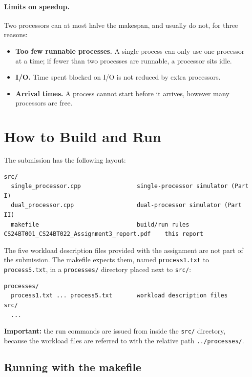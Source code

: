 \documentclass[11pt,a4paper]{article}
\begin{document}
\paragraph{Limits on speedup.} Two processors can at most halve the makespan, and usually
do not, for three reasons:
\begin{itemize}\itemsep1pt
  \item \textbf{Too few runnable processes.} A single process can only use one processor
        at a time; if fewer than two processes are runnable, a processor sits idle.
  \item \textbf{I/O.} Time spent blocked on I/O is not reduced by extra processors.
  \item \textbf{Arrival times.} A process cannot start before it arrives, however many
        processors are free.
\end{itemize}
\newpage

\section{How to Build and Run}

The submission has the following layout:

\begin{lstlisting}
src/
  single_processor.cpp                single-processor simulator (Part I)
  dual_processor.cpp                  dual-processor simulator (Part II)
  makefile                            build/run rules
CS24BT001_CS24BT022_Assignment3_report.pdf    this report
\end{lstlisting}

The five workload description files provided with the assignment are not part of the
submission. The makefile expects them, named \texttt{process1.txt} to
\texttt{process5.txt}, in a \texttt{processes/} directory placed next to \texttt{src/}:

\begin{lstlisting}
processes/
  process1.txt ... process5.txt       workload description files
src/
  ...
\end{lstlisting}

\textbf{Important:} the run commands are issued from inside the \texttt{src/} directory,
because the workload files are referred to with the relative path \texttt{../processes/}.

\subsection{Running with the makefile}
\end{document}
